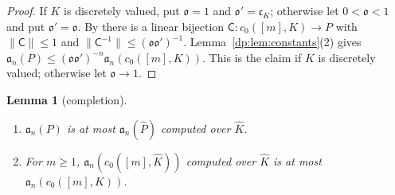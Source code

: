 \documentclass[11pt]{amsart}
\newtheorem{lemma}[theorem]{Lemma}
\theoremstyle{definition}
\theoremstyle{remark}
\numberwithin{equation}{section}
\newcommand{\norm}[1]{\lVert #1\rVert}
\newcommand{\Kh}{\widehat K}
\theoremstyle{plain}
\theoremstyle{definition}
\theoremstyle{plain}
\begin{document}
\begin{proof}
If $K$ is discretely valued, put $\mathfrak o=1$ and $\mathfrak o'=\mathfrak c_K$; otherwise let $0<\mathfrak o<1$ and put $\mathfrak o'=\mathfrak o$. By \cite[Lemma~Q.13(3)]{I} there is a linear bijection $\mathsf C\colon c_0([m],K)\to P$ with $\norm{\mathsf C}\le1$ and $\norm{\mathsf C^{-1}}\le(\mathfrak o\mathfrak o')^{-1}$. Lemma~\ref{dp:lem:constants}(2) gives $\mathfrak a_n(P)\le(\mathfrak o\mathfrak o')^{-n}\mathfrak a_n(c_0([m],K))$. This is the claim if $K$ is discretely valued; otherwise let $\mathfrak o\to1$.
\end{proof}

\begin{lemma}[completion]\label{dp:lem:completion}
\leavevmode
\begin{enumerate}
\item $\mathfrak a_n(P)$ is at most $\mathfrak a_n(\widehat P)$ computed over $\Kh$.
\item For $m\ge1$, $\mathfrak a_n(c_0([m],\Kh))$ computed over $\Kh$ is at most $\mathfrak a_n(c_0([m],K))$.
\end{enumerate}
\end{lemma}
\end{document}
